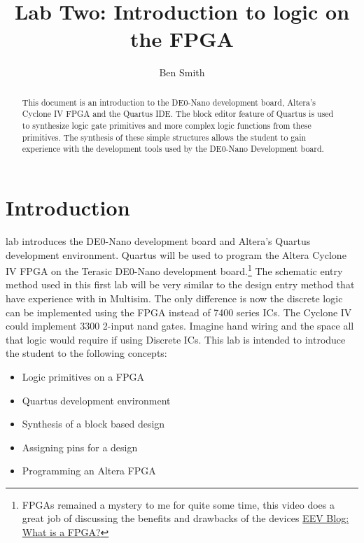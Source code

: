 \title{Lab Two: Introduction to logic on the FPGA}
\author{Ben Smith}



\maketitle

  \begin{abstract}
    This document is an introduction to the DE0-Nano development board, Altera's Cyclone IV FPGA and the Quartus IDE. The block editor feature of Quartus is used to synthesize logic gate primitives and more complex logic functions from these primitives. The synthesis of these simple structures allows the student to gain experience with the development tools used by the DE0-Nano Development board.
  \end{abstract}

  \section{Introduction}
     lab introduces the DE0-Nano development board and Altera's Quartus development environment. Quartus will be used to program the Altera Cyclone IV FPGA on the Terasic DE0-Nano development board.\footnote{FPGAs remained a mystery to me for quite some time, this video does a great job of discussing the benefits and drawbacks of the devices \href{https://www.youtube.com/watch?v=gUsHwi4M4xE}{EEV Blog: What is a FPGA?}}  The schematic entry method  used in this first lab will be very similar to the  design entry method that have experience with in Multisim. The only difference is now the discrete logic can be implemented using the FPGA instead of 7400 series ICs. The Cyclone IV could implement 3300 2-input nand gates. Imagine hand wiring and the space all that logic would require if using Discrete ICs. This lab is intended to introduce the student to the following concepts:
    \begin{itemize}
       \item Logic primitives on a FPGA
       \item Quartus development environment
       \item Synthesis of a block based design
       \item Assigning pins for a design
       \item Programming an Altera FPGA
    \end{itemize}

